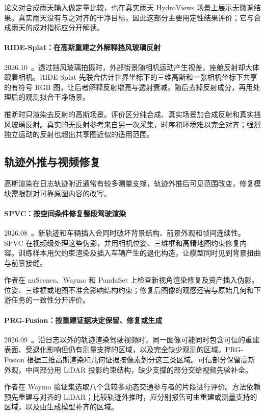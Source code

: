 论文对合成雨天输入做定量比较，也在真实雨天 HydroViews 场景上展示无微调结果。真实雨天没有与之对齐的干净目标，因此这部分主要用定性结果评价；它与合成雨天的成对指标应分开解读。

\paragraph{RIDE-Splat：在高斯重建之外解释挡风玻璃反射}
2026.10~\cite{2610_34632}。透过挡风玻璃拍摄时，外部街景随相机运动产生视差，座舱反射却大体跟着相机。RIDE-Splat 先联合估计世界坐标下的三维高斯和一张相机坐标下共享的有符号 RGB 图，让后者解释反射增亮与透射衰减。随后去掉反射成分，再用处理后的观测拟合干净场景。

推断时只渲染去反射的高斯场景。评价区分纯合成、真实场景加合成反射和真实挡风玻璃反射。真实的无反射参考来自另一次采集，时序和环境难以完全对齐；强烈独立运动的反射也超出共享图近似的适用范围。

\subsection{轨迹外推与视频修复}

高斯渲染在日志轨迹附近通常有较多测量支撑，轨迹外推后可见范围改变，修复模块需限制对可靠原图内容的改写。

\paragraph{SPVC：按空间条件修复整段驾驶渲染}
2026.08~\cite{2608_17420}。新轨迹和车辆插入会同时破坏背景结构、前景外观和帧间连续性。SPVC 在视频级处理这些伪影，并用相机位姿、三维框和高精地图约束修复内容。训练样本用欠约束渲染及插入车辆产生的退化构造，让模型同时见到背景扭曲与前景接缝。

作者在 nuScenes、Waymo 和 PandaSet 上检查新视角渲染修复及资产插入伪影。位姿、三维框或地图不准会影响结构约束；修复后图像的观感还需与原始几何和下游任务的一致性分开评价。

\paragraph{PRG-Fusion：按重建证据决定保留、修复或生成}
2026.09~\cite{2609_06948}。沿日志以外的轨迹渲染驾驶视频时，同一图像可能同时包含可信的重建表面、受退化影响但仍有测量支撑的区域，以及完全缺少观测的区域。PRG-Fusion 根据三维高斯渲染和几何证据按像素划分这三类区域。可信部分保留高斯外观，中间部分用 LiDAR 投影约束结构，缺少支撑的部分交给视频先验补全。

作者在 Waymo 验证集选取八个含较多动态交通参与者的片段进行评价。方法依赖预先重建与对齐的 LiDAR；比较轨迹外推时，应分别报告可由重建或测量支持的区域，以及由生成模型补齐的区域。

